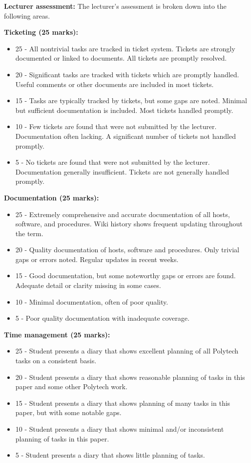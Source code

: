 \documentclass{article}   	%
\begin{document}
\vskip 5mm

\textbf{Lecturer assessment:} The lecturer's assessment is broken down into the following areas.

\textbf{Ticketing (25 marks):}
\begin{itemize}
  \item 25 - All nontrivial tasks are tracked in ticket system. Tickets are strongly documented or linked to documents.  All tickets are promptly resolved.
  \item 20 - Significant tasks are tracked with tickets which are promptly handled.  Useful comments or other documents are included in most tickets.
  \item 15 - Tasks are typically tracked by tickets, but some gaps are noted.  Minimal but sufficient documentation is included.  Most tickets handled promptly.
  \item 10 - Few tickets are found that were not submitted by the lecturer.  Documentation often lacking.  A significant number of tickets not handled promptly.
  \item 5 - No tickets are found that were not submitted by the lecturer.  Documentation generally insufficient.  Tickets are not generally handled promptly.
\end{itemize}

\newpage

\textbf{Documentation (25 marks):}
\begin{itemize}
  \item 25 - Extremely comprehensive and accurate documentation of all hosts, software, and procedures.  Wiki history shows frequent updating throughout the term.
  \item 20 - Quality documentation of hosts, software and procedures.  Only trivial gaps or errors noted.   Regular updates in recent weeks.
  \item 15 - Good documentation, but some noteworthy gaps or errors are found.  Adequate detail or clarity missing in some cases.
  \item 10 - Minimal documentation, often of poor quality.
  \item 5 -  Poor quality documentation with inadequate coverage.
\end{itemize}

\textbf{Time management (25 marks):}
\begin{itemize}
  \item 25 - Student presents a diary that shows excellent planning of all Polytech tasks on a consistent basis.
  \item 20 - Student presents a diary that shows reasonable planning of tasks in this paper and some other Polytech work.
  \item 15 - Student presents a diary that shows planning of many tasks in this paper, but with some notable gaps.
  \item 10 - Student presents a diary that shows minimal and/or inconsistent planning of tasks in this paper.
  \item 5 -  Student presents a diary that shows little planning of tasks.
\end{itemize}
\end{document}
